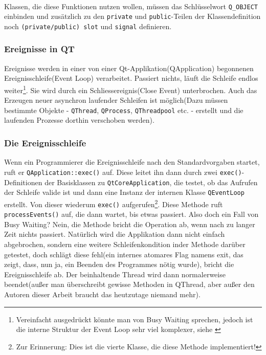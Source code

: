 \paragraph{}
	Klassen, die diese Funktionen nutzen wollen, müssen das Schlüsselwort \linebreak\texttt{Q\_OBJECT} einbinden und zusätzlich zu den 
	\texttt{private} und \texttt{public}-Teilen der Klassendefinition noch \texttt{(private/public) slot} und \texttt{signal} definieren.
\subsubsection{Ereignisse in QT}
	Ereignisse werden in einer von einer Qt-Applikation(QApplication) begonnenen Ereignisschleife(Event Loop) verarbeitet. Passiert nichts, läuft die 
	Schleife endlos weiter\footnote{Vereinfacht ausgedrückt könnte man von Busy Waiting sprechen, jedoch ist die interne Struktur der Event Loop sehr viel
	komplexer, siehe \label{sec:evloop}}. Sie wird durch ein Schliessereignis(Close Event) unterbrochen. Auch das Erzeugen neuer asynchron 
	laufender Schleifen ist möglich(Dazu müssen bestimmte Objekte - \texttt{QThread}, \texttt{QProcess}, \texttt{QThreadpool} etc. - erstellt und die 
    laufenden Prozesse dorthin verschoben werden).
\subsubsection{Die Ereignisschleife} \label{sec:evloop}
	Wenn ein Programmierer die Ereignisschleife nach den Standardvorgaben startet, ruft er \texttt{QApplication::exec()} auf. Diese leitet ihn dann
	durch zwei \texttt{exec()}-Definitionen der Basisklassen zu \texttt{QtCoreApplication}, die  testet, ob das Aufrufen der Schleife valide ist und dann eine
	 Instanz der internen Klasse \texttt{QEventLoop} erstellt. Von dieser wiederum \texttt{exec()} aufgerufen\footnote{Zur Erinnerung: Dies ist die vierte
	Klasse, die diese Methode implementiert!}. Diese Methode ruft \linebreak \texttt{processEvents()} auf, die dann wartet, bis etwas passiert. Also doch ein Fall von
	Busy Waiting? Nein, die Methode bricht die Operation ab, wenn nach zu langer Zeit nichts passiert. Natürlich wird die Applikation dann nicht einfach abgebrochen,
	sondern eine weitere Schleifenkondition inder Methode darüber getestet, doch schlägt diese fehl(ein internes atomares Flag namens exit, das zeigt, dass,
	nun ja, ein Beenden des Programmes nötig wurde), bricht die Ereignisschleife ab. Der beinhaltende Thread  wird dann normalerweise beendet(außer man
	überschreibt gewisse Methoden in QThread, aber außer den Autoren dieser Arbeit braucht das heutzutage niemand mehr).
